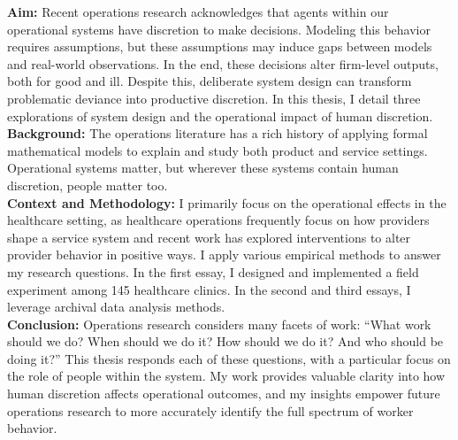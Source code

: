 \noindent
\textbf{Aim:} Recent operations research acknowledges that agents within our operational systems have discretion to make decisions. Modeling this behavior requires assumptions, but these assumptions may induce gaps between models and real-world observations. In the end, these decisions alter firm-level outputs, both for good and ill. Despite this, deliberate system design can transform problematic deviance into productive discretion. In this thesis, I detail three explorations of system design and the operational impact of human discretion. \\
\textbf{Background:} The operations literature has a rich history of applying formal mathematical models to explain and study both product and service settings. Operational systems matter, but wherever these systems contain human discretion, people matter too. \\
\textbf{Context and Methodology:} I primarily focus on the operational effects in the healthcare setting, as healthcare operations frequently focus on how providers shape a service system and recent work has explored interventions to alter provider behavior in positive ways. I apply various empirical methods to answer my research questions. In the first essay, I designed and implemented a field experiment among 145 healthcare clinics. In the second and third essays, I leverage archival data analysis methods. \\
\textbf{Conclusion:} Operations research considers many facets of work: “What work should we do? When should we do it? How should we do it? And who should be doing it?” This thesis responds each of these questions, with a particular focus on the role of people within the system. My work provides valuable clarity into how human discretion affects operational outcomes, and my insights empower future operations research to more accurately identify the full spectrum of worker behavior. \\


\clearpage
